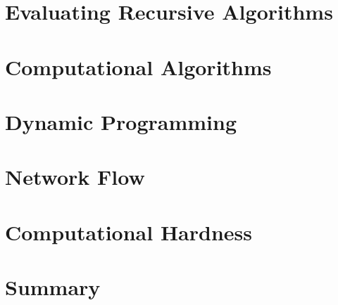 \documentclass{memoir}
\begin{document}
\chapter{Evaluating Recursive Algorithms}


\chapter{Computational Algorithms}




\chapter {Dynamic Programming}



\chapter{Network Flow}


\chapter{Computational Hardness}


\chapter{Summary}


 
 
\end{document}
